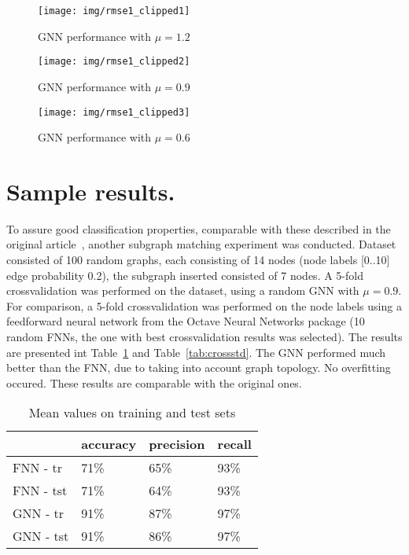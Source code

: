 \documentclass[a4paper, 11pt, twocolumn]{spie}  %
\begin{document}
\begin{figure}
\begin{center}
	\texttt{[image: img/rmse1\_clipped1]}
	\caption{GNN performance with $\mu = 1.2$}
	\label{fig:rmse1}
\end{center}
\end{figure}

\begin{figure}
\begin{center}
	\texttt{[image: img/rmse1\_clipped2]}
	\caption{GNN performance with $\mu = 0.9$}
	\label{fig:rmse2}
\end{center}
\end{figure}

\begin{figure}
\begin{center}
	\texttt{[image: img/rmse1\_clipped3]}
	\caption{GNN performance with $\mu = 0.6$}
	\label{fig:rmse3}
\end{center}
\end{figure}

\section{Sample results.}
To assure good classification properties, comparable with these described in the original article~\cite{scarselli2009graph}, another subgraph matching experiment was conducted. Dataset consisted of 100 random graphs, each consisting of 14 nodes (node labels [0..10] edge probability 0.2), the subgraph inserted consisted of 7 nodes. A 5-fold crossvalidation was performed on the dataset, using a random GNN with $\mu = 0.9$. For comparison, a 5-fold crossvalidation was performed on the node labels using a feedforward neural network from the Octave Neural Networks package (10 random FNNs, the one with best crossvalidation results was selected). The results are presented int Table~\ref{tab:crossmean} and Table~\ref{tab:crossstd}. The GNN performed much better than the FNN, due to taking into account graph topology. No overfitting occured. These results are comparable with the original ones.

\begin{table}[h!]
	\begin{center}
	\begin{tabular}{llll}
	\toprule
	& accuracy & precision & recall \\
	\midrule
	FNN - tr &	71\% &  65\% & 93\% \\
	FNN - tst &	71\% &  64\% &  93\% \\
	GNN - tr &	91\% &  87\%&  97\% \\
	GNN - tst &	91\% &  86\% &  97\% \\
	\bottomrule
	\end{tabular}
	\caption{Mean values on training and test sets}
	\label{tab:crossmean}
	\end{center}
\end{table}
\end{document}
